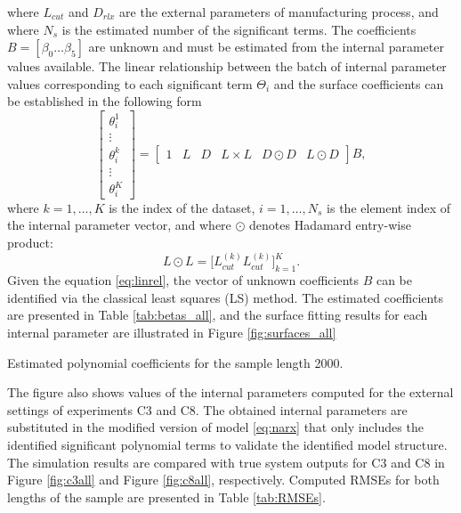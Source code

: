 \documentclass[a4paper,11pt,twoside]{article}
\def\dataset{C}
\theoremstyle{mytheoremstyle}
\begin{document}
where $L_{cut}$ and $D_{rlx}$ are the external parameters of manufacturing process, and where $N_s$ is the estimated number of the significant terms. The coefficients $B = \left[ \beta_0 \dots \beta_5 \right]$ are unknown and must be estimated from the internal parameter values available. The linear relationship between the batch of internal parameter values corresponding to each significant term $\Theta_i$ and the surface coefficients can be established in the following form
\begin{equation}\label{eq:linrel}
\left[\begin{array}{c}
\theta_{i}^{1} \\
\vdots \\
\theta_{i}^{k} \\
\vdots \\
\theta_{i}^{K}
\end{array}\right] =
\left[\begin{array}{cccccc}
1 & L& D& L\times L& D\odot D& L\odot D
\end{array}\right] B,
\end{equation}
where $k = 1, \dots, K$ is the index of the dataset, $i =1, \dots, N_s$ is the element index of the internal parameter vector, and where $\odot$ denotes Hadamard entry-wise product:
\begin{equation*}
L\odot L = \Big[ L_{cut}^{(k)} L_{cut}^{(k)}\Big]^{K}_{k=1}.
\end{equation*}
Given the equation \eqref{eq:linrel}, the vector of unknown coefficients $B$ can be identified via the classical least squares (LS) method. The estimated coefficients are presented in Table \ref{tab:betas_all}, and the surface fitting results for each internal parameter are illustrated in Figure \ref{fig:surfaces_all} 
\begin{table}[!h]
	\centering
	\caption{Estimated polynomial coefficients for the sample length 2000.}\label{tab:betas_all}
	\small
	
\end{table}
The figure also shows values of the internal parameters computed for the external settings of experiments \dataset3 and \dataset8. The obtained internal parameters are substituted in the modified version of model \eqref{eq:narx} that only includes the identified significant  polynomial terms to validate the identified model structure. The simulation results are compared with true system outputs for \dataset3 and \dataset8 in Figure \ref{fig:c3all} and Figure \ref{fig:c8all}, respectively. Computed RMSEs for both lengths of the sample are presented in Table \ref{tab:RMSEs}.
\end{document}
